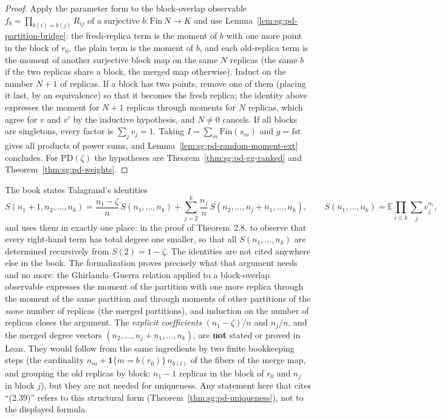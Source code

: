 \begin{proof}
  \leanok
Apply the parameter form to the block-overlap observable $f_b=\prod_{b(i)=b(j)}R_{ij}$ of a surjective $b:\mathrm{Fin}\,N\to K$ and use Lemma~\ref{lem:sg:pd-partition-bridge}: the fresh-replica term is the moment of $b$ with one more point in the block of $r_0$, the plain term is the moment of $b$, and each old-replica term is the moment of another surjective block map on the same $N$ replicas (the same $b$ if the two replicas share a block, the merged map otherwise). Induct on the number $N+1$ of replicas. If a block has two points, remove one of them (placing it last, by an equivalence) so that it becomes the fresh replica; the identity above expresses the moment for $N+1$ replicas through moments for $N$ replicas, which agree for $v$ and $v'$ by the inductive hypothesis, and $N\ne0$ cancels. If all blocks are singletons, every factor is $\sum_jv_j=1$. Taking $I=\sum_m\mathrm{Fin}(s_m)$ and $g=\mathrm{fst}$ gives all products of power sums, and Lemma~\ref{lem:sg:pd-random-moment-ext} concludes. For $\mathrm{PD}(\zeta)$ the hypotheses are Theorem~\ref{thm:sg:pd-gg-ranked} and Theorem~\ref{thm:sg:pd-weights}.
\end{proof}

\begin{remark}\label{rem:sg:pd-talagrand-239}
The book states Talagrand's identities
\[
S(n_1+1,n_2,\dots,n_k)=\frac{n_1-\zeta}{n}\,S(n_1,\dots,n_k)+\sum_{j=2}^k\frac{n_j}{n}\,S(n_2,\dots,n_j+n_1,\dots,n_k),
\qquad S(n_1,\dots,n_k)=\mathbb E\prod_{i\le k}\sum_jv_j^{n_i},
\]
and uses them in exactly one place: in the proof of Theorem~2.8, to observe that every right-hand term has total degree one smaller, so that all $S(n_1,\dots,n_k)$ are determined recursively from $S(2)=1-\zeta$. The identities are not cited anywhere else in the book. The formalization proves precisely what that argument needs and no more: the Ghirlanda--Guerra relation applied to a block-overlap observable expresses the moment of the partition with one more replica through the moment of the same partition and through moments of other partitions of the \emph{same} number of replicas (the merged partitions), and induction on the number of replicas closes the argument. The \emph{explicit coefficients} $(n_1-\zeta)/n$ and $n_j/n$, and the merged degree vectors $(n_2,\dots,n_j+n_1,\dots,n_k)$, are \textbf{not} stated or proved in Lean. They would follow from the same ingredients by two finite bookkeeping steps (the cardinality $n_m+\mathbf 1\{m=b(r_0)\}\,n_{b(l)}$ of the fibers of the merge map, and grouping the old replicas by block: $n_1-1$ replicas in the block of $r_0$ and $n_j$ in block $j$), but they are not needed for uniqueness. Any statement here that cites ``(2.39)'' refers to this structural form (Theorem~\ref{thm:sg:pd-uniqueness}), not to the displayed formula.
\end{remark}

